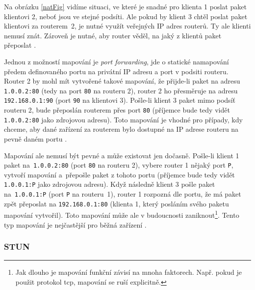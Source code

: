 Na obrázku \ref{natFig} vidíme situaci, ve které je snadné pro klienta 1 poslat
paket klientovi 2, neboť jsou ve stejné podsíti. Ale pokud by klient 3 chtěl
poslat paket klientovi za routerem~2, je nutné využít veřejných IP adres
routerů. Ty ale klienti nemusí znát. Zároveň je nutné, aby router věděl, na jaký
z klientů paket přeposlat \parencite{WebRTCForTheCurious}.

Jednou z možností mapování je \textit{port forwarding}, jde o statické
namapování předem definovaného portu na privátní IP adresu a port v podsiti
routeru. Router 2 by mohl mít vytvořené takové mapování, že přijde-li paket na
adresu \texttt{1.0.0.2:80} (tedy na port \texttt{80} na
routeru 2), router 2 ho přesměruje na adresu \texttt{192.168.0.1:90}
(port \texttt{90} na klientovi 3). Pošle-li klient 3 paket mimo podsíť
routeru 2, bude přeposlán routerem přes port \texttt{80} (příjemce
bude tedy vidět \texttt{1.0.0.2:80} jako zdrojovou adresu). Toto
mapování je vhodné pro případy, kdy chceme, aby dané zařízení za routerem bylo
dostupné na IP adrese routeru na pevně daném portu
\parencite{G2-WhatIsPortForwarding}.

Mapování ale nemusí být pevné a může existovat jen dočasně. Pošle-li klient 1
paket na~\texttt{1.0.0.2:80} (port \texttt{80} na routeru
2), vybere router 1 nějaký port \texttt{P}, vytvoří mapování
a~přepošle paket z tohoto portu (příjemce bude tedy vidět
\texttt{1.0.0.1:P} jako zdrojovou adresu). Když následně klient 3
pošle paket na~\texttt{1.0.0.1:P} (port \texttt{P} na
routeru~1), router 1 rozpozná dle portu, že má paket zpět přeposlat na
\texttt{192.168.0.1:80} (klienta 1, který posláním svého paketu
mapování vytvořil). Toto mapování může ale v budoucnosti zaniknout\footnote{Jak
    dlouho je mapování funkční závisí na mnoha faktorech. Např. pokud je použit
    protokol \gls{tcp}, mapování se ruší explicitně.}. Tento typ mapování je
nejčastější pro běžná zařízení \parencite{WebRTCForTheCurious}.

\subsubsection{STUN}\label{stun}

